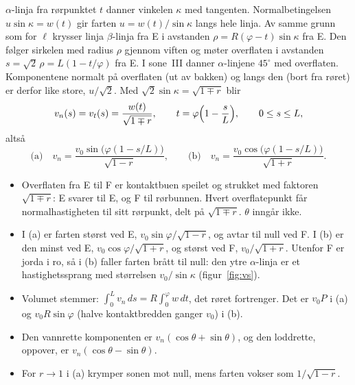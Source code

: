 \documentclass[11pt,a4paper]{article}
\begin{document}
$\alpha$-linja fra rørpunktet $t$ danner vinkelen $\kappa$ med tangenten.
Normalbetingelsen $u\sin\kappa = w(t)$ gir farten $u = w(t)/\sin\kappa$
langs hele linja.  Av samme grunn som for $\ell$ krysser linja
$\beta$-linja fra E i avstanden $\rho = R(\varphi - t)\sin\kappa$ fra E.
Den følger sirkelen med radius $\rho$ gjennom viften og møter overflaten i
avstanden $s = \sqrt2\,\rho = L(1 - t/\varphi)$ fra E.  I sone~III danner
$\alpha$-linjene $45^\circ$ med overflaten.  Komponentene normalt på
overflaten (ut av bakken) og langs den (bort fra røret) er derfor like
store, $u/\sqrt2$.  Med $\sqrt2\sin\kappa = \sqrt{1 \mp r}$ blir
\begin{equation}
  v_n(s) = v_t(s) = \frac{w(t)}{\sqrt{1 \mp r}} ,
  \qquad t = \varphi\Bigl(1 - \frac{s}{L}\Bigr) ,
  \qquad 0 \le s \le L ,
  \label{eq:vs}
\end{equation}
altså
\begin{equation}
  \text{(a)}\quad v_n = \frac{v_0 \sin\bigl(\varphi(1 - s/L)\bigr)}{\sqrt{1 - r}} ,
  \qquad
  \text{(b)}\quad v_n = \frac{v_0 \cos\bigl(\varphi(1 - s/L)\bigr)}{\sqrt{1 + r}} .
\end{equation}
\begin{itemize}
  \item Overflaten fra E til F er kontaktbuen speilet og strukket med
        faktoren $\sqrt{1 \mp r}$: E svarer til E, og F til rørbunnen.
        Hvert overflatepunkt får normalhastigheten til sitt rørpunkt, delt
        på $\sqrt{1 \mp r}$.  $\theta$ inngår ikke.
  \item I (a) er farten størst ved E, $v_0\sin\varphi/\sqrt{1 - r}$, og
        avtar til null ved F.  I (b) er den minst ved E,
        $v_0\cos\varphi/\sqrt{1 + r}$, og størst ved F, $v_0/\sqrt{1 + r}$.
        Utenfor F er jorda i ro, så i (b) faller farten brått til null: den
        ytre $\alpha$-linja er et hastighetssprang med størrelsen
        $v_0/\sin\kappa$ (figur~\ref{fig:vs}).
  \item Volumet stemmer: $\int_0^L v_n\,ds = R\int_0^\varphi w\,dt$, det
        røret fortrenger.  Det er $v_0 P$ i (a) og $v_0 R\sin\varphi$ (halve
        kontaktbredden ganger $v_0$) i (b).
  \item Den vannrette komponenten er $v_n(\cos\theta + \sin\theta)$, og den
        loddrette, oppover, er $v_n(\cos\theta - \sin\theta)$.
  \item For $r \to 1$ i (a) krymper sonen mot null, mens farten vokser som
        $1/\sqrt{1 - r}$.
\end{itemize}
\end{document}
